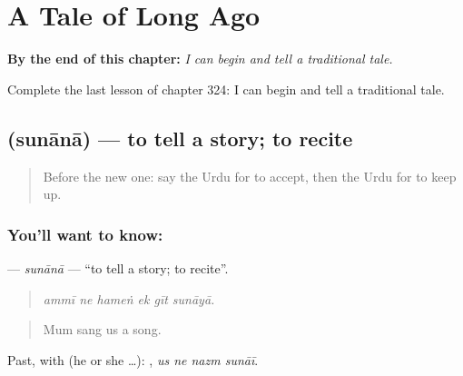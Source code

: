 
\chapter{A Tale of Long Ago}
\label{ch:ur-a-tale-of-long-ago}

\begin{chapteropening}
\textbf{By the end of this chapter:} \emph{I can begin and tell a traditional tale.}

Complete the last lesson of chapter 324: I can begin and tell a traditional tale.
\end{chapteropening}

\section[\texorpdfstring{\ur{سنانا} (sunānā)}{سنانا (sunānā)}]{ (sunānā) — to tell a story; to recite}

\label{lesson:UR-C324-sunana}



\begin{quote}
Before the new one: say the Urdu for to accept, then the Urdu for to keep up.
\end{quote}

\subsection*{You'll want to know: }
\textbf{} — \emph{sunānā} — \textquotedblleft{}to tell a story; to recite\textquotedblright{}.

\begin{quote}
     
\end{quote}

\begin{quote}
\emph{ammī ne hameṅ ek gīt sunāyā.}
\end{quote}

\begin{quote}
Mum sang us a song.
\end{quote}

Past, with  (he or she …):    , \emph{us ne nazm sunāī}.

